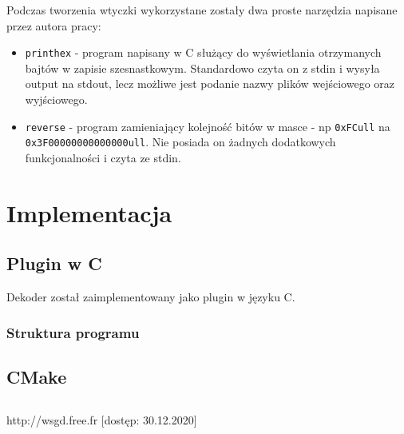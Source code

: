 \documentclass[a4paper, 12pt, twoside, openright]{article}
\begin{document}
	\indent\par
	Podczas tworzenia wtyczki wykorzystane zostały dwa proste narzędzia napisane przez autora pracy:
	\begin{itemize}
		\item \texttt{printhex} - program napisany w C służący do wyświetlania otrzymanych bajtów w zapisie szesnastkowym. Standardowo
			czyta on z stdin i wysyła output na stdout, lecz możliwe jest podanie nazwy plików wejściowego oraz wyjściowego.
		\item \texttt{reverse} - program zamieniający kolejność bitów w masce - np \texttt{0xFCull} na \texttt{0x3F00000000000000ull}.
			Nie posiada on żadnych dodatkowych funkcjonalności i czyta ze stdin.
	\end{itemize}




\newpage
\section{Implementacja}
\subsection{Plugin w C}
Dekoder został zaimplementowany jako plugin w języku C. 
\subsubsection{Struktura programu}

\subsection{CMake}

\subsection{}


\newpage

\begin{thebibliography}{99}

		http://wsgd.free.fr [dostęp: 30.12.2020]


\end{thebibliography}


\vspace{85mm}
\end{document}
